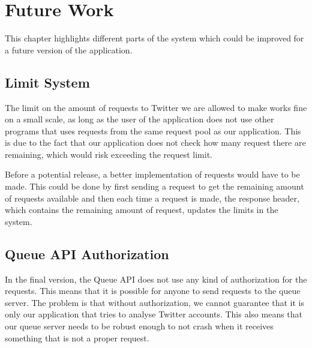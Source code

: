 \chapter{Future Work}\label{fwork}
This chapter highlights different parts of the system which could
be improved for a future version of the application.

\section*{Limit System}
The limit on the amount of requests to Twitter we are allowed to make works fine
on a small scale, as long as the user of the application does not use other
programs that uses requests from the same request pool as our application. This
is due to the fact that our application does not check how many request there
are remaining, which would risk exceeding the request limit. \nl

Before a potential release, a better implementation of requests would have to be
made. This could be done by first sending a request to get the remaining amount
of requests available and then each time a request is made, the response
header, which contains the remaining amount of request, updates the
limits in the system.\nl


{}

\section*{Queue API Authorization}
In the final version, the Queue API does not use any kind of authorization for
the requests. This means that it is possible for anyone to send requests to the
queue server. The problem is that without authorization, we cannot guarantee
that it is only our application that tries to analyse Twitter accounts. This
also means that our queue server needs to be robust enough to not crash when it
receives something that is not a proper request. \nl


